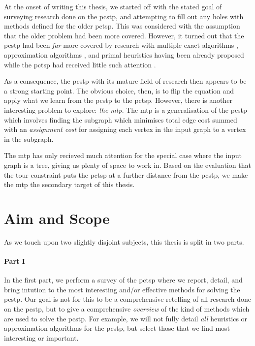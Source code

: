 At the onset of writing this thesis, we started off with the stated
goal of surveying research done
on the \gls{pcstp}, and attempting to fill out any holes with methods defined for the older
\gls{pctsp}. This was considered with the assumption that the older problem had
been more covered.
However, it turned out that the \gls{pcstp} had been \textit{far} more covered
by research with multiple exact algorithms
\citep{ljubic2005solving, leitner2016dual, gamrath2017scip},
approximation algorithms \citep{Bienstock1993,goemans1995general,Johnson:2000:PCS:338219.338637},
and primal heuristics \citep{canuto2001local,fu2014knowledge,akhmedov2016divide}
having been already proposed while the \gls{pctsp} had received little such attention
\citep{archetti2014chapter}.

As a consequence, the \gls{pcstp} with its mature field of research then appears to be a strong
starting point. The obvious choice, then, is to flip the equation and apply what we learn
from the \gls{pcstp} to the \gls{pctsp}.
However, there is another interesting problem to explore: \textit{the \gls{mtp}}.
The \gls{mtp} is a generalisation of the \gls{pcstp}
which involves finding the subgraph which minimises total edge cost summed with an
\textit{assignment cost} for assigning each vertex in the input graph to a vertex in
the subgraph.

The \gls{mtp} has only recieved much attention for the special case where the input graph is
a tree, giving us plenty of space to work in. Based on the evaluation that the tour constraint
puts the \gls{pctsp} at a further distance from the \gls{pcstp}, we make the \gls{mtp}
the secondary target of this thesis.
\section{Aim and Scope}
As we touch upon two slightly disjoint subjects, this thesis is split
in two parts.
\paragraph{Part I}

In the first part, we perform a
survey of the \acrlong{pctsp} where we report, detail, and bring intution to the most interesting
and/or effective methods for solving the \gls{pcstp}.
Our goal is not for this to be a comprehensive retelling
of all research done on the \gls{pcstp}, but to give a comprehensive \textit{overview} of
the kind of methods which are used to solve the \gls{pcstp}.
For example, we will not fully detail \textit{all}
heuristics or approximation algorithms for the \gls{pcstp},
but select those that we find most interesting or important.

